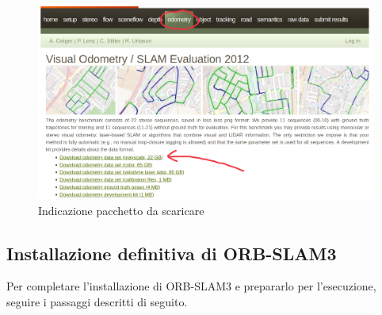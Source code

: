 \documentclass[12pt,a4paper]{report}
\begin{document}
\begin{figure}[h]
    \centering
    \includegraphics[width=0.9\linewidth]{img/kitti_dataset.png}
    \caption{Indicazione pacchetto da scaricare}
\end{figure}

\subsection{Installazione definitiva di ORB-SLAM3}

Per completare l'installazione di ORB-SLAM3 e prepararlo per l'esecuzione, seguire i passaggi descritti di seguito.
\end{document}
